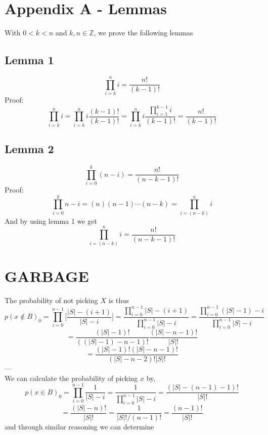 \documentclass[10pt,a4paper]{article}
\begin{document}
\section*{Appendix A - Lemmas}

With $0 < k < n$ and $k,n \in \mathbb{Z}$, we prove the following lemmas
\subsection*{Lemma 1}
$$ \prod_{i=k}^n i = \frac{n!}{(k-1)!}$$
Proof:
$$ \prod_{i=k}^n i = \prod_{i=k}^{n} i \frac{(k-1)!}{(k-1)!}
 = \prod_{i=k}^n i \frac{\prod_{i=1}^{k-1} i}{(k-1)!}
 = \frac{n!}{(k-1)!}$$
\subsection*{Lemma 2}
$$ \prod_{i=0}^k (n-i) = \frac{n!}{(n-k-1)!}$$
Proof:
$$ \prod_{i=0}^k n-i = (n)(n-1)\cdots(n-k) = \prod_{i=(n-k)}^n i$$
And by using lemma 1 we get
$$ \prod_{i=(n-k)}^n i = \frac{n!}{(n-k-1)!}$$
\section*{GARBAGE}
The probability of not picking $X$ is thus
$$p(x \not \in B)_0 = \prod_{i=0}^{n-1} \bigg[ \frac{|S|-(i + 1)}{|S| - i} \bigg]
= \frac{\prod_{i=0}^{n-1} |S|- (i+1)}{\prod_{i=0}^{n-1} |S| - i}
= \frac{\prod_{i=0}^{n-1} (|S|-1)-i}{\prod_{i=0}^{n-1} |S| - i}$$
$$= \frac{(|S|-1)!}{((|S| - 1) - n - 1)!} \frac{(|S| - n - 1)!}{|S|!}$$
$$= \frac{(|S|-1)!(|S| - n - 1)!}{(|S| - n - 2)!|S|!}$$
---\\
We can calculate the probability of picking $x$ by,
$$p(x \in B)_0
=\prod_{i=0}^{n-1}\frac{1}{ |S| - i}
=\frac{1}{\prod_{i=0}^{n-1} |S| - i}
= \frac{(|S|-(n-1)-1)!}{|S|!}$$
$$ = \frac{(|S|- n)!}{|S|!}
=\frac{1}{|S|!/(n-1)!} = \frac{(n-1)!}{|S|!}$$
and through similar reasoning we can determine
\end{document}
